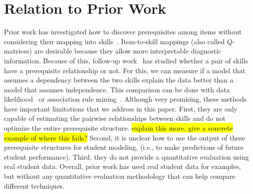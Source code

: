 \documentclass{edm_template}
\newcommand{\hl}[1]{\colorbox{yellow}{#1}}
\begin{document}
\section{Relation to Prior Work}
\label{sec:previous_work}

Prior work has investigated how to discover %
 prerequisites among items without considering their mapping into skills~\cite{desmarais2006learned,vuong2010method}. %
Item-to-skill mappings (also called $Q$-matrices) are desirable because they allow more interpretable diagnostic information.
Because of this, follow-up work~\cite{brunskill2010estimating,chen2015discovering}  has studied whether a pair of skills have a prerequisite relationship or not.
For this,  we can measure if a model that assumes a dependency between the two skills explain the data better than a model that assumes independence. %
This comparison can be done with data likelihood~\cite{brunskill2010estimating} or  association rule mining~\cite{chen2015discovering}.
Although very promising, these methods have important limitations that we address in this paper.
First,  they are only capable of estimating the pairwise relationships between skills and do not optimize the entire prerequisite structure.
\hl{explain this more, give a concrete example of where this fails?}
Second, it is unclear how to use the output of these prerequisite structures for student modeling, (i.e., to make predictions of future student performance).
Third, they do not provide a quantitative evaluation using real student data.
Overall, prior work has used real student data for examples, but without any quantitative evaluation methodology that can help compare different techniques.
\end{document}
